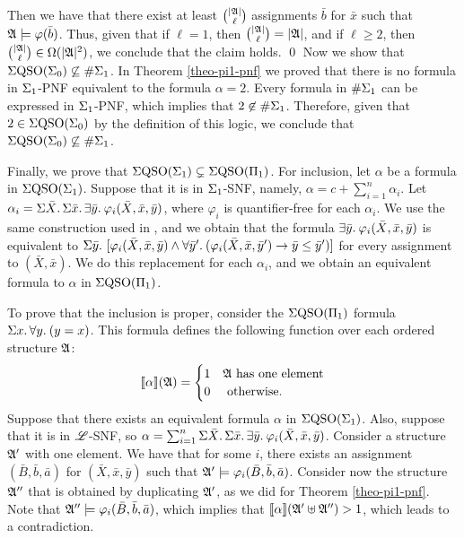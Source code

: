 Then we have that there exist at least $\binom{\vert \mathfrak{A} \vert}{\ell}$ assignments $\bar b$ for $\bar{x}$ such that $\mathfrak{A}\models\varphi(\bar{b})$. Thus, given that if $\ell = 1$, then $\binom{\vert \mathfrak{A} \vert}{\ell} = \vert \mathfrak{A} \vert$, and if $\ell \geq 2$, then $\binom{\vert \mathfrak{A} \vert}{\ell} \in \Omega(\vert \mathfrak{A} \vert^2)$, we conclude that the claim holds.
\qed
{}
Now we show that $\Sigma{\rm QSO}(\Sigma_{0}) \not\subseteq \#\Sigma_{1}$. 
In Theorem \ref{theo-pi1-pnf} we proved that there is no formula in $\Sigma_{1}$-PNF equivalent to the formula $\alpha = 2$. 
Every formula in $\#\Sigma_{1}$ can be expressed in $\Sigma_{1}$-PNF, which implies that $2 \not\in \#\Sigma_{1}$. Therefore, given that $2 \in \Sigma{\rm QSO}(\Sigma_{0})$ by the definition of this logic, we conclude that $\Sigma{\rm QSO}(\Sigma_{0}) \not\subseteq \#\Sigma_{1}$.

Finally, we prove that $\Sigma{\rm QSO}(\Sigma_{1})\subsetneq\Sigma{\rm QSO}(\Pi_{1})$. 
For inclusion, let $\alpha$ be a formula in $\Sigma{\rm QSO}(\Sigma_{1})$. 
Suppose that it is in $\Sigma_{1}$-SNF, namely, $\alpha = c + \sum_{i = 1}^{n}\alpha_i$. 
Let $\alpha_i = \Sigma{\bar{X}}.\,\Sigma{\bar{x}}.\,\exists{\bar{y}}.\:\varphi_i(\bar{X},\bar{x},\bar{y})$, where $\varphi_i$ is quantifier-free for each $\alpha_i$. 
We use the same construction used in \cite{SalujaST95}, and we obtain that the formula $\exists{\bar{y}}.\:\varphi_i(\bar{X},\bar{x},\bar{y})$ is equivalent to $\Sigma{\bar{y}}.\,\,[\varphi_i(\bar{X},\bar{x},\bar{y}) \wedge \forall{\bar{y}'}.\:(\varphi_i(\bar{X},\bar{x},\bar{y}')\to\bar{y}\leq\bar{y}')]$ for every assignment to $(\bar{X},\bar{x})$. 
We do this replacement for each $\alpha_i$, and we obtain an equivalent formula to $\alpha$ in $\Sigma{\rm QSO}(\Pi_{1})$.

To prove that the inclusion is proper, consider the $\Sigma{\rm QSO}(\Pi_{1})$ formula $\Sigma{x}.\, \forall{y}.\:(y = x)$. 
This formula defines the following function over each ordered structure $\mathfrak{A}$:
$$
{\llbracket{}{\alpha}\rrbracket}(\mathfrak{A}) = 
\begin{cases}
1 &\mathfrak{A} \text{ has one element}\\
0 &\text{ otherwise}.
\end{cases}
$$
Suppose that there exists an equivalent formula $\alpha$ in $\Sigma{\rm QSO}(\Sigma_{1})$. 
Also, suppose that it is in $\mathscr{L}$-SNF, so $\alpha = \sum_{i = 1}^n\Sigma{\bar{X}}.\,\Sigma{\bar{x}}.\,\exists{\bar{y}}.\:\varphi_i(\bar{X},\bar{x},\bar{y})$. 
Consider a structure $\mathfrak{A}'$ with one element. 
We have that for some $i$, there exists an assignment $(\bar{B},\bar{b},\bar{a})$ for $(\bar{X},\bar{x},\bar{y})$ such that $\mathfrak{A}' \models\varphi_i(\bar{B},\bar{b},\bar{a})$. 
Consider now the structure $\mathfrak{A}''$ that is obtained by duplicating $\mathfrak{A}'$, as we did for Theorem \ref{theo-pi1-pnf}. 
Note that $\mathfrak{A}''\models\varphi_i(\bar{B},\bar{b},\bar{a})$, which implies that ${\llbracket{}{\alpha}\rrbracket}(\mathfrak{A}' \uplus \mathfrak{A}'') > 1$, which leads to a contradiction.
